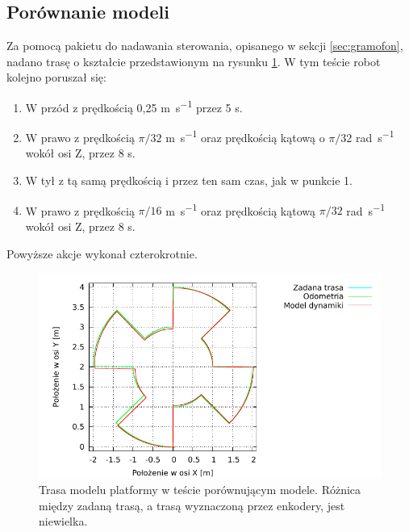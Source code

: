 	\subsection{Porównanie modeli}
		Za pomocą pakietu do nadawania sterowania, opisanego w sekcji \ref{sec:gramofon}, nadano trasę o kształcie przedstawionym na rysunku \ref{plot:comparison_xy}.
		W tym teście robot kolejno poruszał się:
		\begin{enumerate}
			\item W przód z prędkością 0,25 \si{\metre\per\second} przez 5 \si{\second}.
			\item W prawo z prędkością $\pi/32$ \si{\metre\per\second} oraz prędkością kątową o $\pi/32$ \si{\radian\per\second} wokół osi Z, przez 8 \si{\second}.
			\item W tył z tą samą prędkością i przez ten sam czas, jak w punkcie 1.
			\item W prawo z prędkością $\pi/16$ \si{\metre\per\second} oraz prędkością kątową $\pi/32$ \si{\radian\per\second} wokół osi Z, przez 8 \si{\second}.
		\end{enumerate}
		Powyższe akcje wykonał czterokrotnie.
		
		\begin{figure}[H]
			\centering
			\includegraphics[width=\textwidth]{plots/comparison_xy.pdf}
				\caption{Trasa modelu platformy w teście porównującym modele. Różnica między zadaną trasą, a trasą wyznaczoną przez enkodery, jest niewielka.}
			\label{plot:comparison_xy}
		\end{figure}
		
